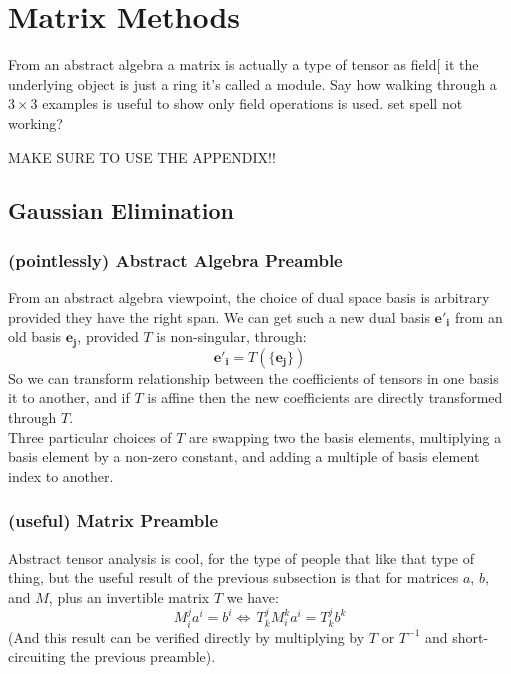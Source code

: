 
\chapter{Matrix Methods}
From an abstract algebra a matrix is actually a type of tensor as field[
it the underlying object is just a ring it's called a module.
Say how walking through a $3\times 3$ examples is useful to show only field operations is used.
set spell not working?

MAKE SURE TO USE THE APPENDIX!!

\section{Gaussian Elimination}
\subsection{(pointlessly) Abstract Algebra Preamble}
From an abstract algebra viewpoint,
the choice of dual space basis is arbitrary provided they have the right span.
We can get such a new dual basis $\mathbf{e'_i}$ from an old basis $\mathbf{e_j}$, provided $T$ is non-singular, through:
\[\mathbf{e'_i} = T(\{\mathbf{e_j}\})\]
So we can transform relationship between the coefficients of tensors in one basis it to another,
and if $T$ is affine then the new coefficients are directly transformed through $T$.
\\

Three particular choices of $T$ are swapping two the basis elements,
multiplying a basis element by a non-zero constant,
and adding a multiple of basis element index to another.

\subsection{(useful) Matrix Preamble}
\label{matrix:useful-preamble}
Abstract tensor analysis is cool,
for the type of people that like that type of thing,
but the useful result of the previous subsection is that for matrices $a$, $b$, and $M$, plus an invertible matrix $T$ we have:
\[ M^j_ia^i = b^i \Leftrightarrow\, T^j_kM^k_ia^i = T^j_kb^k \]
(And this result can be verified directly by multiplying by $T$ or $T^{-1}$ and short-circuiting the previous preamble).
\\

